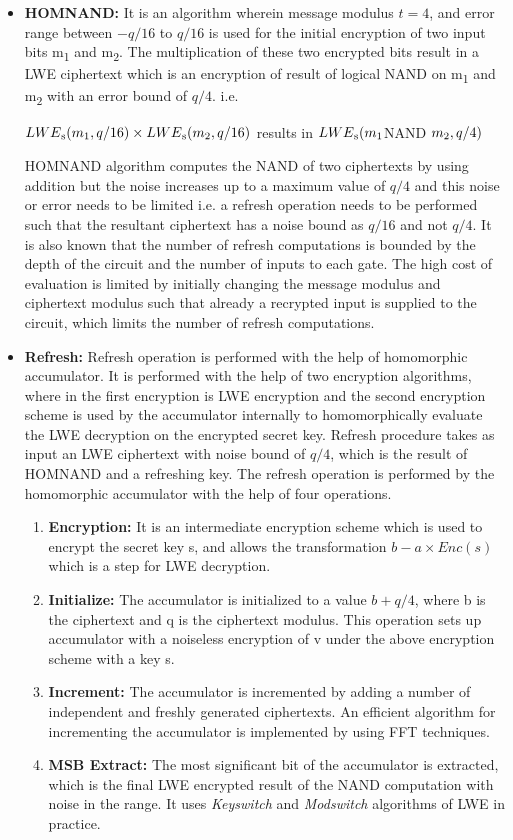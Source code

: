 \begin{itemize}
\item
\textbf{HOMNAND:} It is an algorithm wherein message modulus $t=4$, and error range between $-q/16$ to $q/16$ is used for the initial encryption of two input bits m\textsubscript{1} and  m\textsubscript{2}. The multiplication of these two encrypted bits result in a LWE ciphertext which is an encryption of result of logical NAND on m\textsubscript{1} and  m\textsubscript{2} with an error bound of $q/4$.
i.e.

$LWE\textsubscript{s}(m\textsubscript{1},q/16)\times LWE\textsubscript{s}(m\textsubscript{2},q/16)$ results in $LWE\textsubscript{s}(m\textsubscript{1}$NAND $m\textsubscript{2},q/4)$

\vspace{0.25cm}
\noindent HOMNAND algorithm computes the NAND of two ciphertexts by using addition but the noise increases up to a maximum value of $q/4$ and this noise or error needs to be limited i.e. a refresh operation needs to be performed such that the resultant ciphertext has a noise bound as $q/16$ and not $q/4$. It is also known that the number of refresh computations is bounded by the depth of the circuit and the number of inputs to each gate. The high cost of evaluation is limited by initially changing the message modulus and ciphertext modulus such that already a recrypted input is supplied to the circuit, which limits the number of refresh computations. 
\item
\textbf{Refresh:} Refresh operation is performed with the help of homomorphic accumulator. It is performed with the help of two encryption algorithms, where in the first encryption is LWE encryption and the second encryption scheme is used by the accumulator internally to homomorphically evaluate the LWE decryption on the encrypted secret key.
Refresh procedure takes as input an LWE ciphertext with noise bound of $q/4$, which is the result of HOMNAND and a refreshing key. The refresh operation is performed by the homomorphic accumulator with the help of four operations.
\begin{enumerate}
\item
\textbf{Encryption:} It is an intermediate encryption scheme which is used to encrypt the secret key s, and allows the transformation $b-a\times Enc(s)$ which is a step for LWE decryption.
\item
\textbf{Initialize:} The accumulator is initialized to a value $b+q/4$, where b is the ciphertext and q is the ciphertext modulus. This operation sets up accumulator with a noiseless encryption of v under the above encryption scheme with a key s.
\item
\textbf{Increment:} The accumulator is incremented by adding a number of independent and freshly generated ciphertexts. An efficient algorithm for incrementing the accumulator is implemented by using FFT techniques.
\item
\textbf{MSB Extract:} The most significant bit of the accumulator is extracted, which is the final LWE encrypted result of the NAND computation with noise in the range. It uses \textit{Keyswitch} and \textit{Modswitch} algorithms of LWE in practice.
\end{enumerate}
\end{itemize}
